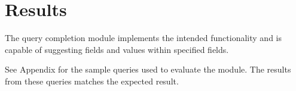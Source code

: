 \section{Results}\label{results}

The query completion module implements the intended functionality and is capable of suggesting fields and values within specified fields. 

See Appendix for the sample queries used to evaluate the module. The results from these queries matches the expected result.